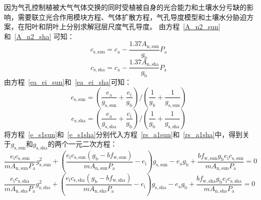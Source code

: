 因为气孔控制植被大气气体交换的同时受植被自身的光合能力和土壤水分亏缺的影响，需要联立光合作用模块方程、气体扩散方程，气孔导度模型和土壤水分胁迫方案，在阳叶和阴叶上分别求解冠层尺度气孔导度。
由方程~\eqref{A_n2_sun}和~\eqref{A_n2_sha} 可知：
\begin{equation}\label{cs_a1sun}
c_{\mathrm{s,sun}}=c_{\mathrm{a}}-\frac{1.37 A_{\mathrm{n,sun}}}{g_{\mathrm{b}}} P_{\mathrm {a}}
\end{equation}
\begin{equation}\label{cs_a1sha}
c_{\mathrm{s,sha}}=c_{\mathrm{a}}-\frac{1.37 A_{\mathrm{n,sha}}}{g_{\mathrm{b}}} P_{\mathrm {a}}
\end{equation}
由方程~\eqref{ea_ei_sun}和~\eqref{ea_ei_sha}可知：
\begin{equation}\label{e_s1sun}
e_{\mathrm{s,sun}}=\left(\frac{e_{\mathrm{a}}}{g_{\mathrm{s,sun}}}+\frac{e_{\mathrm{i}}}{g_{\mathrm{b}}}\right) /\left(\frac{1}{g_{\mathrm{b}}}+\frac{1}{g_{\mathrm{s,sun}}}\right)
\end{equation}
\begin{equation}\label{e_s1sha}
e_{\mathrm{s,sha}}=\left(\frac{e_{\mathrm{a}}}{g_{\mathrm{s,sha}}}+\frac{e_{\mathrm{i}}}{g_{\mathrm{b}}}\right) /\left(\frac{1}{g_{\mathrm{b}}}+\frac{1}{g_{\mathrm{s,sha}}}\right)
\end{equation}
将方程~\eqref{e_s1sun}和~\eqref{e_s1sha}分别代入方程~\eqref{rs_a1sun}和~\eqref{rs_a1sha}中，得到关于$g_{\mathrm{s,sun}}$和$g_{\mathrm{s,sha}}$的两个一元二次方程：
\begin{equation}\label{ei_cssun}
\frac{e_{\mathrm{i}} c_{\mathrm{s,sun}}}{m A_{\mathrm{n,sun}} P_{\mathrm {a}}} g_{\mathrm{s,sun}}^{2}+\left(\frac{e_{\mathrm{i}} c_{\mathrm{s,sun}}\left(g_{\mathrm{b}} -b f_{\mathrm{w,sun}}\right)}{m A_{\mathrm{n,sun}} P_{\mathrm {a}}}-e_{\mathrm{i}}\right) g_{\mathrm{s,sun}}
-e_{\mathrm{a}} g_{\mathrm{b}}+\frac{b f_{\mathrm{w,sun}} g_{\mathrm{b}} e_{\mathrm{i}} c_{\mathrm{s,sun}}}{m A_{\mathrm{n,sun}} P_{\mathrm {a}}}=0
\end{equation}
\begin{equation}\label{ei_cssha}
\frac{e_{\mathrm{i}} c_{\mathrm{s,sha}}}{m A_{\mathrm{n,sha}} P_{\mathrm {a}}} g_{\mathrm{s,sha}}^{2}+\left(\frac{e_{\mathrm{i}} c_{\mathrm{s,sha}}\left(g_{\mathrm{b}} -b f_{\mathrm{w,sha}}\right)}{m A_{\mathrm{n,sha}} P_{\mathrm {a}}}-e_{\mathrm{i}}\right) g_{\mathrm{s,sha}}
-e_{\mathrm{a}} g_{\mathrm{b}}+\frac{b f_{\mathrm{w,sha}} g_{\mathrm{b}} e_{\mathrm{i}} c_{\mathrm{s,sha}}}{m A_{\mathrm{n,sha}} P_{\mathrm {a}}}=0
\end{equation}
